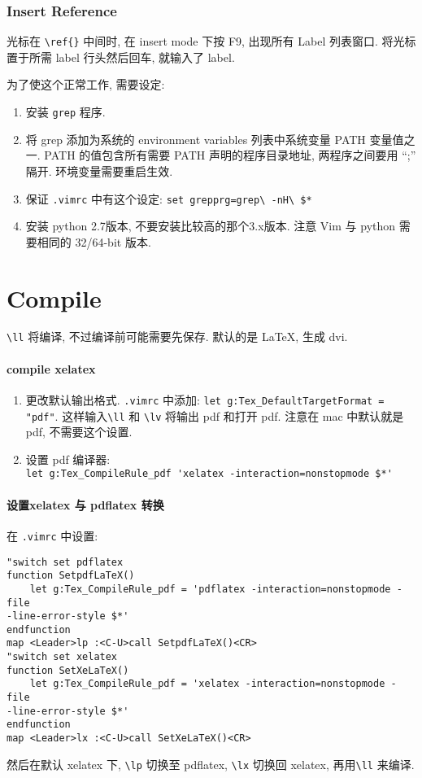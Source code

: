 \documentclass{article}
\begin{document}
\section{Insert Reference}
光标在 \verb`\ref{}` 中间时, 在 insert mode 下按 F9, 出现所有 Label 列表窗口. 将光标置于所需 label 行头然后回车, 就输入了 label.

为了使这个正常工作, 需要设定:
\begin{enumerate}
\item 安装 \verb`grep` 程序.
\item 将 grep 添加为系统的 environment variables 列表中系统变量 PATH 变量值之一. PATH 的值包含所有需要 PATH 声明的程序目录地址, 两程序之间要用 ``;'' 隔开. 环境变量需要重启生效.
\item 保证 \verb`.vimrc` 中有这个设定: \verb`set grepprg=grep\ -nH\ $*`
\item 安装 python 2.7版本, 不要安装比较高的那个3.x版本. 注意 Vim 与 python 需要相同的 32/64-bit 版本. 
\end{enumerate}
\part{Compile}
\verb`\ll` 将编译, 不过编译前可能需要先保存. 默认的是 LaTeX, 生成 dvi.
\subsection*{compile xelatex}
\begin{enumerate}
\item 更改默认输出格式. \verb`.vimrc` 中添加: \verb`let g:Tex_DefaultTargetFormat = "pdf"`. 这样输入\verb`\ll` 和 \verb`\lv` 将输出 pdf 和打开 pdf. 注意在 mac 中默认就是 pdf, 不需要这个设置.
\item 设置 pdf 编译器:\hfill\\
  \verb`let g:Tex_CompileRule_pdf 'xelatex -interaction=nonstopmode $*'`
\end{enumerate}
\subsection*{设置xelatex 与 pdflatex 转换}
在 \verb`.vimrc` 中设置:
\begin{verbatim}
"switch set pdflatex
function SetpdfLaTeX()
	let g:Tex_CompileRule_pdf = 'pdflatex -interaction=nonstopmode -file
-line-error-style $*'
endfunction
map <Leader>lp :<C-U>call SetpdfLaTeX()<CR>
"switch set xelatex
function SetXeLaTeX()
	let g:Tex_CompileRule_pdf = 'xelatex -interaction=nonstopmode -file
-line-error-style $*'
endfunction
map <Leader>lx :<C-U>call SetXeLaTeX()<CR>
\end{verbatim}
然后在默认 xelatex 下, \verb`\lp` 切换至 pdflatex, \verb`\lx` 切换回 xelatex, 再用\verb`\ll` 来编译.
\end{document}

